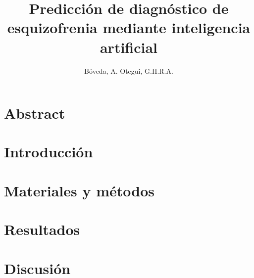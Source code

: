 \documentclass[12pt,a4paper,twoside]{article}
\title{Predicción de diagnóstico de esquizofrenia mediante inteligencia artificial}
\author{Bóveda, A. Otegui, G.H.R.A.}
\date{}
\begin{document}
\maketitle

\section{Abstract}


\section{Introducción}
    
\section{Materiales y métodos}
    
\section{Resultados}
\section{Discusión}


\end{document}
